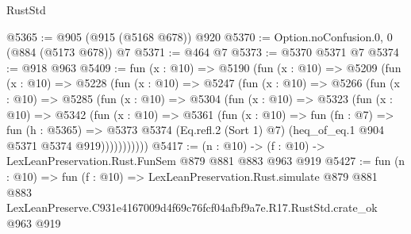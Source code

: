 \begin{lexlean}{RustStd}
\begin{coremodule}
@5365 := @905 (@915 (@5168 @678)) @920
@5370 := Option.noConfusion.{0, 0} (@884 (@5173 @678)) @7
@5371 := @464 @7
@5373 := @5370 @5371 @7
@5374 := @918 @963
@5409 := fun (x : @10) =>
  @5190
    (fun (x : @10) =>
    @5209
      (fun (x : @10) =>
      @5228
        (fun (x : @10) =>
        @5247
          (fun (x : @10) =>
          @5266
            (fun (x : @10) =>
            @5285
              (fun (x : @10) =>
              @5304
                (fun (x : @10) =>
                @5323
                  (fun (x : @10) =>
                  @5342
                    (fun (x : @10) =>
                    @5361
                      (fun (x : @10) =>
                      fun (fn : @7) =>
                      fun (h : @5365) =>
                      @5373
                        @5374
                        (Eq.refl.{2} (Sort 1) @7)
                        (heq_of_eq.{1} @904 @5371 @5374 @919)))))))))))
@5417 := (n : @10) -> (f : @10) -> LexLeanPreservation.Rust.FunSem @879 @881 @883 @963 @919
@5427 := fun (n : @10) =>
  fun (f : @10) =>
  LexLeanPreservation.Rust.simulate
    @879
    @881
    @883
    LexLeanPreserve.C931e4167009d4f69c76fcf04afbf9a7e.R17.RustStd.crate_ok
    @963
    @919
\end{coremodule}
\end{lexlean}
